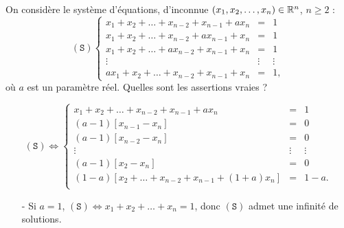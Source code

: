 \begin{question}
On considère le système d'équations, d'inconnue $(x_1,x_2,\dots,x_n) \in \mathbb{R}^n$, $n \ge 2$ :
$$(\mathtt{S})  
\left\{\begin{array}{ccc}
x_1+x_2+\dots+ x_{n-2}+x_{n-1}+ax_n&=&1\\
x_1+x_2+\dots+ x_{n-2}+ax_{n-1}+x_n&=&1\\
x_1+x_2+\dots+ ax_{n-2}+x_{n-1}+x_n&=&1\\
\vdots  &\vdots&\vdots\\
ax_1+x_2+\dots+ x_{n-2}+x_{n-1}+x_n&=&1,
\end{array}\right.$$
où $a$ est un paramètre réel. Quelles sont les assertions vraies ?
\begin{answers}  
\end{answers}
\begin{explanations} 
$$(\mathtt{S})  \Leftrightarrow 
\left\{\begin{array}{rcc}
x_1+x_2+\dots+ x_{n-2}+x_{n-1}+ax_n \qquad  \qquad  &=&1\\
(a-1)[x_{n-1}-x_n]\qquad \qquad&=&0\\
(a-1)[x_{n-2}-x_n]\qquad \qquad&=&0\\
\vdots \qquad \qquad&\vdots&\vdots\\
(a-1)[x_2-x_n]\qquad \qquad&=&0\\
(1-a)[x_2+\dots+x_{n-2}+x_{n-1}+(1+a)x_n]&=&1-a.\\
\end{array}\right.$$
\begin{enumerate}
\item[-]Si $a=1$, $(\mathtt{S}) \Leftrightarrow x_1+x_2+\dots+ x_n =1$, donc $(\mathtt{S})$ admet une infinité de solutions.

\end{enumerate}
\end{explanations}
\end{question}
